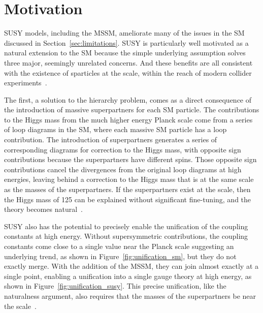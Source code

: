 \section{Motivation}

\ac{SUSY} models, including the \ac{MSSM}, ameliorate many of the issues in the \ac{SM} discussed in Section~\ref{sec:limitations}.
\ac{SUSY} is particularly well motivated as a natural extension to the \ac{SM} because the simple underlying assumption solves three major, seemingly unrelated concerns.
And these benefits are all consistent with the existence of sparticles at the \TeV scale, within the reach of modern collider experiments~\cite{susy_motivation}.

The first, a solution to the hierarchy problem, comes as a direct consequence of the introduction of massive superpartners for each \ac{SM} particle.
The contributions to the Higgs mass from the much higher energy Planck scale come from a series of loop diagrams in the \ac{SM}, where each massive \ac{SM} particle has a loop contribution.
The introduction of superpartners generates a series of corresponding diagrams for correction to the Higgs mass, with opposite sign contributions because the superpartners have different spins.
Those opposite sign contributions cancel the divergences from the original loop diagrams at high energies, leaving behind a correction to the Higgs mass that is at the same scale as the masses of the superpartners. 
If the superpartners exist at the \TeV scale, then the Higgs mass of 125 \GeV can be explained without significant fine-tuning, and the theory becomes natural~\cite{susy_motivation}.

\ac{SUSY} also has the potential to precisely enable the unification of the coupling constants at high energy.
Without supersymmetric contributions, the coupling constants come close to a single value near the Planck scale suggesting an underlying trend, as shown in Figure~\ref{fig:unification_sm}, but they do not exactly merge.
With the addition of the \ac{MSSM}, they can join almost exactly at a single point, enabling a unification into a single gauge theory at high energy, as shown in Figure~\ref{fig:unification_susy}. 
This precise unification, like the naturalness argument, also requires that the masses of the superpartners be near the \TeV scale~\cite{susy_motivation}.

